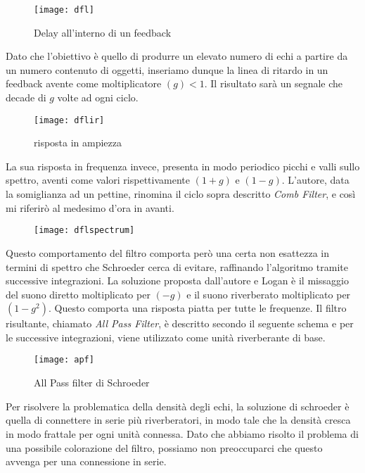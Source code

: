 \begin{figure}[htp]
\centering
\texttt{[image: dfl]}
\caption{Delay all'interno di un feedback}
\label{fig:dfl}
\end{figure}

Dato che l'obiettivo è quello di produrre un elevato numero di echi a partire da un numero contenuto di oggetti, inseriamo dunque la linea di ritardo in un feedback avente come moltiplicatore $(g) < 1$. 
Il risultato sarà un segnale che decade di $g$ volte ad ogni ciclo. 

\begin{figure}[htp]
\centering
\texttt{[image: dflir]}
\caption{risposta in ampiezza}
\label{fig:dflir}
\end{figure}

La sua risposta in frequenza invece, presenta in modo periodico picchi e valli sullo spettro, aventi come valori rispettivamente $(1+g)$ e $(1-g)$. L’autore, data la somiglianza ad un pettine, rinomina il ciclo sopra descritto \emph{Comb Filter}, e così mi riferirò al medesimo d’ora in avanti.

\begin{figure}[htp]
\centering
\texttt{[image: dflspectrum]}
\caption{}
\label{fig:dflspectrum}
\end{figure}

Questo comportamento del filtro comporta però una certa non esattezza in termini di spettro che Schroeder cerca di evitare, raffinando l’algoritmo tramite successive integrazioni.
La soluzione proposta dall’autore e Logan è il missaggio del suono diretto moltiplicato per $(-g)$ e il suono riverberato moltiplicato per $(1-g^2)$. Questo comporta una risposta piatta per tutte le frequenze. Il filtro risultante, chiamato \emph{All Pass Filter}, è descritto secondo il seguente schema e per le successive integrazioni, viene utilizzato come unità riverberante di base.

\begin{figure}[htp]
\centering
\texttt{[image: apf]}
\caption{All Pass filter di Schroeder}
\label{fig:apf}
\end{figure}

Per risolvere la problematica della densità degli echi, la soluzione di schroeder è quella di connettere in serie più riverberatori, in modo tale che la densità cresca in modo frattale per ogni unità connessa. Dato che abbiamo risolto il problema di una possibile colorazione del filtro, possiamo non preoccuparci che questo avvenga per una connessione in serie.

